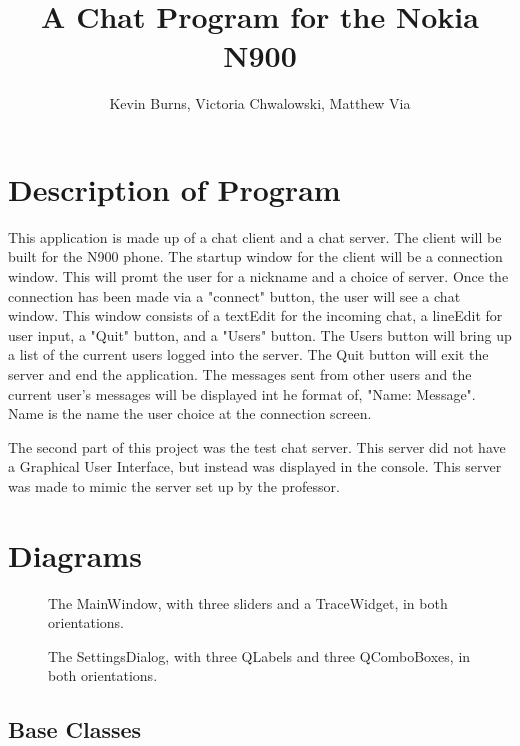 \documentclass[12pt]{article}
\begin{document}
\title{A Chat Program for the Nokia N900}
\author{Kevin Burns, Victoria Chwalowski, Matthew Via}
\date{}
\maketitle

\section{Description of Program}

This application is made up of a chat client and a chat server. The client will be built for the N900 phone. The startup window for the client will be a connection window. This will promt the user for a nickname and a choice of server. Once the connection has been made via a "connect" button, the user will see a chat window. This window consists of a textEdit for the incoming chat, a lineEdit for user input, a "Quit" button, and a "Users" button.  The Users button will bring up a list of the current users logged into the server. The Quit button will exit the server and end the application. The messages sent from other users and the current user's messages will be displayed int he format of, "Name: Message". Name is the name the user choice at the connection screen. 

The second part of this project was the test chat server. This server did not have a Graphical User Interface, but instead was displayed in the console. This server was made to mimic the server set up by the professor.


\section{Diagrams}
\begin{figure}[H]
  \centering
    
  \caption{The MainWindow, with three sliders and a TraceWidget, in both
  orientations.}
\end{figure}

\begin{figure}[H]
  \centering
    
  \caption{The SettingsDialog, with three QLabels and three QComboBoxes, in both
  orientations.}
\end{figure}

\subsection{Base Classes}
\end{document}
